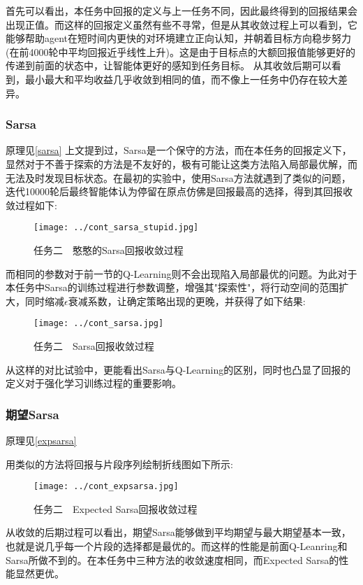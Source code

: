 \documentclass[UTF8]{ctexart}
\begin{document}
首先可以看出，本任务中回报的定义与上一任务不同，因此最终得到的回报结果会出现正值。而这样的回报定义虽然有些不寻常，但是从其收敛过程上可以看到，它能够帮助agent在短时间内更快的对环境建立正向认知，并朝着目标方向稳步努力(在前4000轮中平均回报近乎线性上升)。这是由于目标点的大额回报值能够更好的传递到前面的状态中，让智能体更好的感知到任务目标。
从其收敛后期可以看到，最小最大和平均收益几乎收敛到相同的值，而不像上一任务中仍存在较大差异。
\subsubsection{Sarsa}\label{sarsaexpriment}
原理见\ref{sarsa}
上文提到过，Sarsa是一个保守的方法，而在本任务的回报定义下，显然对于不善于探索的方法是不友好的，极有可能让这类方法陷入局部最优解，而无法及时发现目标状态。在最初的实验中，使用Sarsa方法就遇到了类似的问题，迭代10000轮后最终智能体认为停留在原点仿佛是回报最高的选择，得到其回报收敛过程如下:
\begin{figure}[H]
    \centering
    \texttt{[image: ../cont\_sarsa\_stupid.jpg]}
    \caption{任务二　憨憨的Sarsa回报收敛过程}
\end{figure}

而相同的参数对于前一节的Q-Learning则不会出现陷入局部最优的问题。为此对于本任务中Sarsa的训练过程进行参数调整，增强其"探索性"，将行动空间的范围扩大，同时缩减$\epsilon$衰减系数，让确定策略出现的更晚，并获得了如下结果:

\begin{figure}[H]
    \centering
    \texttt{[image: ../cont\_sarsa.jpg]}
    \caption{任务二　Sarsa回报收敛过程}
\end{figure}    

从这样的对比试验中，更能看出Sarsa与Q-Learning的区别，同时也凸显了回报的定义对于强化学习训练过程的重要影响。

\subsubsection{期望Sarsa}
原理见\ref{expsarsa}

用类似的方法将回报与片段序列绘制折线图如下所示:
\begin{figure}[H]
    \centering
    \texttt{[image: ../cont\_expsarsa.jpg]}
    \caption{任务二　Expected Sarsa回报收敛过程}
\end{figure}

从收敛的后期过程可以看出，期望Sarsa能够做到平均期望与最大期望基本一致，也就是说几乎每一个片段的选择都是最优的。而这样的性能是前面Q-Leanring和Sarsa所做不到的。在本任务中三种方法的收敛速度相同，而Expected Sarsa的性能显然更优。
\end{document}
